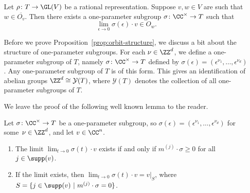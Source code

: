 \begin{theorem}{\label{thm:hmtori}}
Let $\rho\colon T \rightarrow \GL(V)$ be a rational representation.
Suppose $v,w \in V$ are such that $w\in\overline{O_v}$.
Then there exists a one-parameter subgroup $\sigma\colon\CC^\times\rightarrow T$ such that
\[
\lim_{\epsilon\to 0}\sigma(\epsilon) \cdot v \in O_w.
\]
\end{theorem}

Before we prove Proposition~\ref{prop:orbit-structure}, we discuss a bit about the structure of one-parameter subgroups.
For each $\nu \in \ZZ^d$, we define a one-parameter subgroup of $T$, namely $\sigma\colon \CC^\times \rightarrow T$ defined
by $\sigma(\epsilon) = (\epsilon^{\nu_1},\ldots,\epsilon^{\nu_d})$.
Any one-parameter subgroup of $T$ is of this form.
This gives an identification of abelian groups $\ZZ^d \cong \mathcal{Y}(T)$, where $\mathcal{Y}(T)$ denotes the collection of all one-parameter subgroups of $T$.

We leave the proof of the following well known lemma to the reader.

\begin{lemma}\label{lem:tori-1psg}
Let $\sigma\colon \CC^\times \rightarrow T$ be a one-parameter subgroup, so $\sigma(\epsilon) = (\epsilon^{\nu_1},\ldots,\epsilon^{\nu_d})$ for some~$\nu\in\ZZ^d$, and let $v\in \CC^n$.
\begin{enumerate}
\item The limit $\lim_{t \to 0} \sigma(t) \cdot v$ exists if and only if $m^{(j)} \cdot \sigma \geq 0$ for all $j \in \supp(v)$.
\item If the limit exists, then $\lim_{t \to 0} \sigma(t) \cdot v = v|_S$, where $S = \{j \in \supp(v) \ | \ m^{(j)} \cdot \sigma =  0\}$.
\end{enumerate}
\end{lemma}

